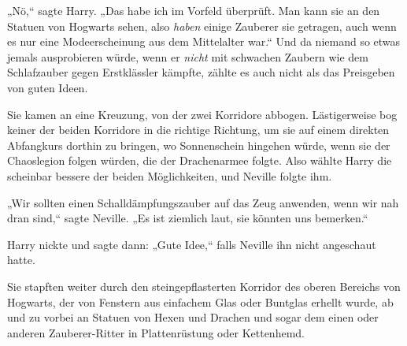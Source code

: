 „Nö,“ sagte Harry. „Das habe ich im Vorfeld überprüft. Man kann sie an den Statuen von Hogwarts sehen, also \emph{haben} einige Zauberer sie getragen, auch wenn es nur eine Modeerscheinung aus dem Mittelalter war.“ Und da niemand so etwas jemals ausprobieren würde, wenn er \emph{nicht} mit schwachen Zaubern wie dem Schlafzauber gegen Erstklässler kämpfte, zählte es auch nicht als das Preisgeben von guten Ideen.

Sie kamen an eine Kreuzung, von der zwei Korridore abbogen. Lästigerweise bog keiner der beiden Korridore in die richtige Richtung, um sie auf einem direkten Abfangkurs dorthin zu bringen, wo Sonnenschein hingehen würde, wenn sie der Chaoslegion folgen würden, die der Drachenarmee folgte. Also wählte Harry die scheinbar bessere der beiden Möglichkeiten, und Neville folgte ihm.

„Wir sollten einen Schalldämpfungszauber auf das Zeug anwenden, wenn wir nah dran sind,“ sagte Neville. „Es ist ziemlich laut, sie könnten uns bemerken.“

Harry nickte und sagte dann: „Gute Idee,“ falls Neville ihn nicht angeschaut hatte.

Sie stapften weiter durch den steingepflasterten Korridor des oberen Bereichs von Hogwarts, der von Fenstern aus einfachem Glas oder Buntglas erhellt wurde, ab und zu vorbei an Statuen von Hexen und Drachen und sogar dem einen oder anderen Zauberer-Ritter in Plattenrüstung oder Kettenhemd.

